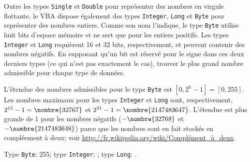 \begin{exercice}
  Outre les types \texttt{Single} et \texttt{Double} pour représenter
  des nombres en virgule flottante, le VBA dispose également des types
  \texttt{Integer}, \texttt{Long} et \texttt{Byte} pour représenter
  des nombres entiers. Comme son nom l'indique, le type \texttt{Byte}
  utilise huit bits d'espace mémoire et ne sert que pour les entiers
  positifs. Les types \texttt{Integer} et \texttt{Long} requièrent 16
  et 32 bits, respectivement, et peuvent contenir des nombres
  négatifs. En supposant qu'un bit est réservé pour le signe dans ces
  deux derniers types (ce qui n'est pas exactement le cas), trouver le
  plus grand nombre admissible pour chaque type de données.
  \begin{sol}
    L'étendue des nombres admissibles pour le type \texttt{Byte} est
    $[0, 2^8 - 1] = [0, 255]$. Les nombres maximaux pour les types
    \texttt{Integer} et \texttt{Long} sont, respectivement, $2^{15} -
    1 = \nombre{32767}$ et $2^{31} - 1 = \nombre{2147483647}$.
    L'étendue est plus grande de 1 pour les nombres négatifs
    ($-\nombre{32768}$ et $-\nombre{2147483648}$) parce que les
    nombres sont en fait stockés en compléement à deux; voir
    \url{http://fr.wikipedia.org/wiki/Complément_à_deux}.
  \end{sol}
  \begin{rep}
    Type \texttt{Byte}: 255; type \texttt{Integer}: ;
    type \texttt{Long}: .
  \end{rep}
\end{exercice}

